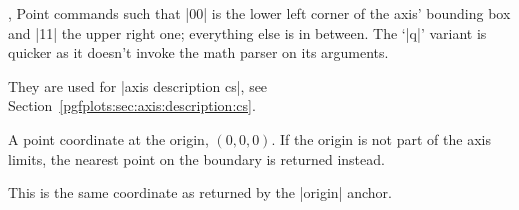 \begin{commandlist}{%
    \pgfplotspointdescriptionxy{},
    \pgfplotsqpointdescriptionxy{}%
}
    Point commands such that |{0}{0}| is the lower left corner of the axis'
    bounding box and |{1}{1}| the upper right one; everything else is in
    between. The `|q|' variant is quicker as it doesn't invoke the math parser
    on its arguments.

    They are used for |axis description cs|, see
    Section~\ref{pgfplots:sec:axis:description:cs}.
\end{commandlist}

\begin{commandlist}{\pgfplotspointaxisorigin}
    A point coordinate at the origin, $(0,0,0)$. If the origin is not part of
    the axis limits, the nearest point on the boundary is returned instead.

    This is the same coordinate as returned by the |origin| anchor.
\end{commandlist}

